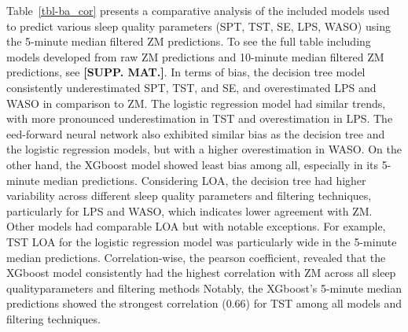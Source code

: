 \documentclass[
  super,
  preprint,
  3p]{elsarticle}
\begin{document}
Table~\ref{tbl-ba_cor} presents a comparative analysis of the included
models used to predict various sleep quality parameters (SPT, TST, SE,
LPS, WASO) using the 5-minute median filtered ZM predictions. To see the
full table including models developed from raw ZM predictions and
10-minute median filtered ZM predictions, see \textbf{{[}SUPP. MAT.{]}}.
In terms of bias, the decision tree model consistently underestimated
SPT, TST, and SE, and overestimated LPS and WASO in comparison to ZM.
The logistic regression model had similar trends, with more pronounced
underestimation in TST and overestimation in LPS. The eed-forward neural
network also exhibited similar bias as the decision tree and the
logistic regression models, but with a higher overestimation in WASO. On
the other hand, the XGboost model showed least bias among all,
especially in its 5-minute median predictions. Considering LOA, the
decision tree had higher variability across different sleep quality
parameters and filtering techniques, particularly for LPS and WASO,
which indicates lower agreement with ZM. Other models had comparable LOA
but with notable exceptions. For example, TST LOA for the logistic
regression model was particularly wide in the 5-minute median
predictions. Correlation-wise, the pearson coefficient, revealed that
the XGboost model consistently had the highest correlation with ZM
across all sleep qualityparameters and filtering methods Notably, the
XGboost's 5-minute median predictions showed the strongest correlation
(0.66) for TST among all models and filtering techniques.
\end{document}
